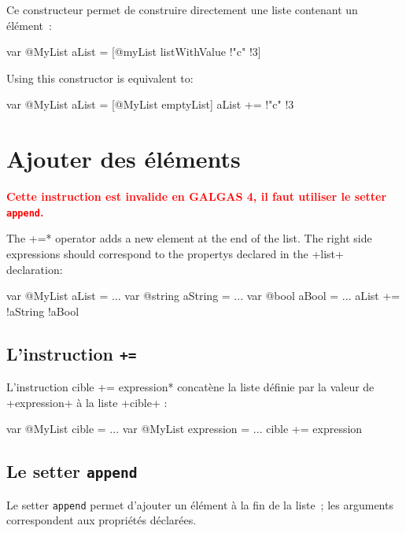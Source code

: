 Ce constructeur permet de construire directement une liste contenant un élément~:

\begin{galgas}
var @MyList aList = [@myList listWithValue !"c" !3]
\end{galgas}


Using this constructor is equivalent to:

\begin{galgas}
var @MyList aList = [@MyList emptyList]
aList += !"c" !3
\end{galgas}

\section{Ajouter des éléments}


\textcolor{red}{\bf Cette instruction est invalide en GALGAS 4, il faut utiliser le setter \texttt{append}.}

The  \ggs*+=* operator adds a new element at the end of the list. The right side expressions should correspond to the propertys declared in the \ggs+list+ declaration:

\begin{galgas}
var @MyList aList = ...
var @string aString = ...
var @bool aBool = ...
aList += !aString !aBool
\end{galgas}


\subsection{L'instruction \texttt{+=}}

L'instruction \ggs*cible += expression* concatène la liste définie par la valeur de \ggs+expression+ à la liste \ggs+cible+ :

\begin{galgas}
var @MyList cible = ...
var @MyList expression = ...
cible += expression
\end{galgas}







\subsection{Le setter \texttt{append}}

Le setter \texttt{append} permet d'ajouter un élément à la fin de la liste~; les arguments correspondent aux propriétés déclarées.


